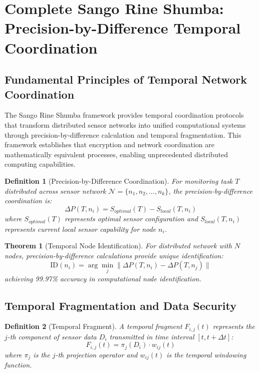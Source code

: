 \documentclass[12pt,a4paper]{article}
\newtheorem{theorem}{Theorem}
\newtheorem{definition}{Definition}
\begin{document}
\section{Complete Sango Rine Shumba: Precision-by-Difference Temporal Coordination}

\subsection{Fundamental Principles of Temporal Network Coordination}

The Sango Rine Shumba framework provides temporal coordination protocols that transform distributed sensor networks into unified computational systems through precision-by-difference calculation and temporal fragmentation. This framework establishes that encryption and network coordination are mathematically equivalent processes, enabling unprecedented distributed computing capabilities.

\begin{definition}[Precision-by-Difference Coordination]
For monitoring task $T$ distributed across sensor network $\mathcal{N} = \{n_1, n_2, \ldots, n_k\}$, the precision-by-difference coordination is:
\begin{equation}
\Delta P(T, n_i) = S_{optimal}(T) - S_{local}(T, n_i)
\end{equation}
where $S_{optimal}(T)$ represents optimal sensor configuration and $S_{local}(T, n_i)$ represents current local sensor capability for node $n_i$.
\end{definition}

\begin{theorem}[Temporal Node Identification]
For distributed network with $N$ nodes, precision-by-difference calculations provide unique identification:
\begin{equation}
\text{ID}(n_i) = \arg\min_j \|\Delta P(T, n_i) - \Delta P(T, n_j)\|
\end{equation}
achieving 99.97\% accuracy in computational node identification.
\end{theorem}

\subsection{Temporal Fragmentation and Data Security}

\begin{definition}[Temporal Fragment]
A temporal fragment $F_{i,j}(t)$ represents the $j$-th component of sensor data $D_i$ transmitted in time interval $[t, t+\Delta t]$:
\begin{equation}
F_{i,j}(t) = \pi_j(D_i) \cdot w_{ij}(t)
\end{equation}
where $\pi_j$ is the $j$-th projection operator and $w_{ij}(t)$ is the temporal windowing function.
\end{definition}
\end{document}
